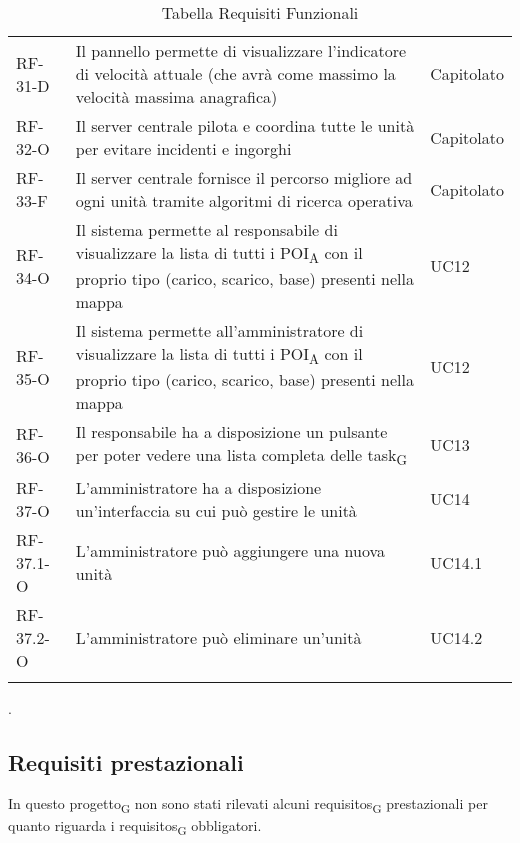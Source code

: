 \begin{longtable}{ 
		>{}p{} 
		>{}p{}
		>{\centering}p{} }
RF-31-D		&	Il pannello permette di visualizzare l'indicatore di velocità attuale (che avrà come massimo la velocità massima anagrafica)	&	Capitolato\tabularnewline				
RF-32-O		&	Il server centrale pilota e coordina tutte le unità per evitare incidenti e ingorghi	&	Capitolato\tabularnewline
RF-33-F		&	Il server centrale fornisce il percorso migliore ad ogni unità tramite algoritmi di ricerca operativa	&	Capitolato\tabularnewline				
RF-34-O		&	Il sistema permette al responsabile di visualizzare la lista di tutti i \acrshort{POI}\textsubscript{A} con il proprio tipo (carico, scarico, base) presenti nella mappa	&	UC12\tabularnewline
RF-35-O		&	Il sistema permette all'amministratore di visualizzare la lista di tutti i \acrshort{POI}\textsubscript{A} con il proprio tipo (carico, scarico, base) presenti nella mappa	&	UC12\tabularnewline				
RF-36-O		&	Il responsabile ha a disposizione un pulsante per poter vedere una lista completa delle \gls{task}\textsubscript{G}	&	UC13\tabularnewline			
RF-37-O		&	L'amministratore ha a disposizione un'interfaccia su cui può gestire le unità	&	UC14\tabularnewline
RF-37.1-O		&	L'amministratore può aggiungere una nuova unità	&	UC14.1\tabularnewline
RF-37.2-O		&	L'amministratore può eliminare un'unità	&	UC14.2\tabularnewline
\caption{Tabella Requisiti Funzionali\label{ Tabella Requisiti Funzionali}}
\end{longtable}.
\subsection{Requisiti prestazionali}
In questo \gls{progetto}\textsubscript{G} non sono stati rilevati alcuni \glspl{requisito}\textsubscript{G} prestazionali per quanto riguarda i \glspl{requisito}\textsubscript{G} obbligatori.
